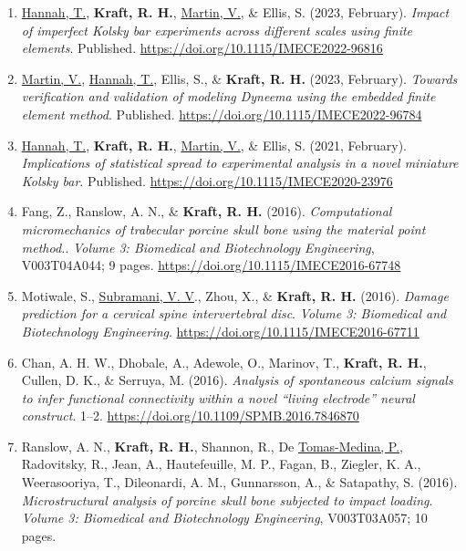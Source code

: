 \documentclass[11pt]{article}
\begin{document}
\begin{enumerate}
\def\labelenumi{\arabic{enumi}.}
\item
  \underline{Hannah, T.}, \textbf{\textbf{Kraft,} R. 
H.}, \underline{Martin, V.}, \& Ellis, S. 
(2023, February).
  \emph{Impact of imperfect Kolsky bar experiments across different
  scales using finite elements}. 
Published.
  \url{https://doi.org/10.1115/IMECE2022-96816}
\item
  \underline{Martin, V.}, \underline{Hannah, T.}, Ellis, S., \& \textbf{\textbf{Kraft,} R. 
H.} (2023, February).
  \emph{Towards verification and validation of modeling Dyneema using
  the embedded finite element method}. 
Published.
  \url{https://doi.org/10.1115/IMECE2022-96784}
\item
  \underline{Hannah, T.}, \textbf{\textbf{Kraft,} R. 
H.}, \underline{Martin, V.}, \& Ellis, S. 
(2021, February).
  \emph{Implications of statistical spread to experimental analysis in a
  novel miniature Kolsky bar}. 
Published.
  \url{https://doi.org/10.1115/IMECE2020-23976}
\item
  Fang, Z., Ranslow, A. 
N., \& \textbf{\textbf{Kraft,} R. 
H.} (2016). 
\emph{Computational
  micromechanics of trabecular porcine skull bone using the material
  point method.}. 
\emph{Volume 3: Biomedical and Biotechnology
  Engineering}, V003T04A044; 9 pages.
  \url{https://doi.org/10.1115/IMECE2016-67748}
\item
  Motiwale, S., \underline{Subramani, V. 
V}., Zhou, X., \& \textbf{\textbf{Kraft,} R. 
H.} (2016).
  \emph{Damage prediction for a cervical spine intervertebral disc}.
  \emph{Volume 3: Biomedical and Biotechnology Engineering}.
  \url{https://doi.org/10.1115/IMECE2016-67711}
\item
  Chan, A. 
H. 
W., Dhobale, A., Adewole, O., Marinov, T., \textbf{\textbf{Kraft,} R. 
H.},
  Cullen, D. 
K., \& Serruya, M. 
(2016). 
\emph{Analysis of spontaneous
  calcium signals to infer functional connectivity within a novel
  ``living electrode'' neural construct}. 
1--2.
  \url{https://doi.org/10.1109/SPMB.2016.7846870}
\item
  Ranslow, A. 
N., \textbf{\textbf{Kraft,} R. 
H.}, Shannon, R., De \underline{Tomas-Medina, P.},
  Radovitsky, R., Jean, A., Hautefeuille, M. 
P., Fagan, B., Ziegler, K.
  A., Weerasooriya, T., Dileonardi, A. 
M., Gunnarsson, A., \& Satapathy,
  S. 
(2016). 
\emph{Microstructural analysis of porcine skull bone
  subjected to impact loading}. 
\emph{Volume 3: Biomedical and
  Biotechnology Engineering}, V003T03A057; 10 pages.

\end{enumerate}
\end{document}
